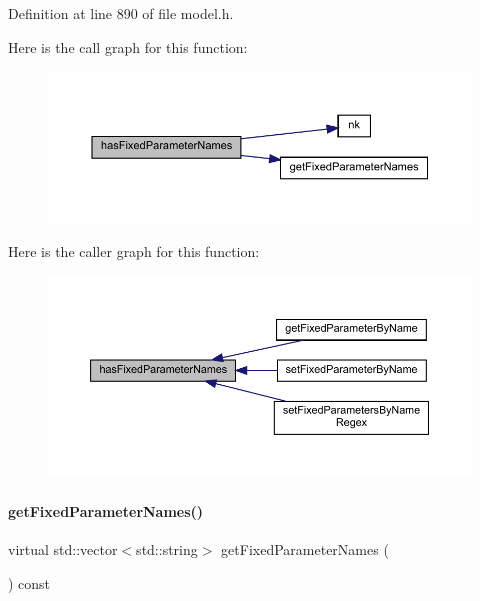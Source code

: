 Definition at line 890 of file model.\+h.

Here is the call graph for this function\+:
\nopagebreak
\begin{figure}[H]
\begin{center}
\leavevmode
\includegraphics[width=350pt]{classamici_1_1_model_a964e924a1fe271f88bac4cfa909e2879_cgraph}
\end{center}
\end{figure}
Here is the caller graph for this function\+:
\nopagebreak
\begin{figure}[H]
\begin{center}
\leavevmode
\includegraphics[width=350pt]{classamici_1_1_model_a964e924a1fe271f88bac4cfa909e2879_icgraph}
\end{center}
\end{figure}
\mbox{\label{classamici_1_1_model_a40260fd33966dc70d0edfa21bf655012}} 
\paragraph{\texorpdfstring{get\+Fixed\+Parameter\+Names()}{getFixedParameterNames()}}
{\footnotesize\ttfamily virtual std\+::vector$<$std\+::string$>$ get\+Fixed\+Parameter\+Names (\begin{DoxyParamCaption}{ }\end{DoxyParamCaption}) const\hspace{0.3cm}{\ttfamily [virtual]}}

